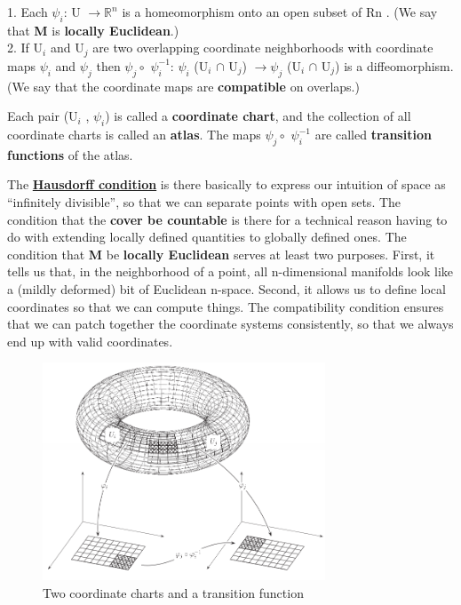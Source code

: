 1. Each $\psi_i$: U $\rightarrow \mathbb{R}^n$ is a homeomorphism onto an open subset of Rn . (We say
that \textbf{M} is \textbf{locally Euclidean}.) \\
2. If U$_i$ and U$_j$ are two overlapping coordinate neighborhoods with coordinate maps $\psi_i$ and $\psi_j$ 
then $\psi_j \circ$ $\psi_i^{-1}$: $\psi_i$ (U$_i$ $\cap$ U$_j$) $\rightarrow \psi_j$ (U$_i$ $\cap$ U$_j$) is
a diffeomorphism. (We say that the coordinate maps are \textbf{compatible} on
overlaps.)

Each pair (U$_i$ , $\psi_i$) is called a \textbf{coordinate chart}, and the collection of all coordinate
charts is called an \textbf{atlas}. The maps $\psi_j \circ$  $\psi_i^{-1}$ are called \textbf{transition functions} of the
atlas.

The \href{https://www.quora.com/What-is-the-significance-of-Hausdorff-Spaces-How-do-these-measurements-help-us-What-does-it-allow-us-to-have}{\textbf{Hausdorff condition}}
is there basically to express our intuition of space as “infinitely divisible”, so that we can separate points with open sets. 
The condition that the \textbf{cover be countable} is there for a technical reason having to do
with extending locally defined quantities to globally defined ones. 
The condition that \textbf{M} be \textbf{locally Euclidean} serves at least two purposes. 
First, it tells us that, in the neighborhood of a point, all n-dimensional manifolds look like a (mildly deformed) bit of Euclidean n-space. 
Second, it allows us to define local coordinates so that we can compute things. 
The compatibility condition ensures that we can patch together the coordinate systems consistently, so that we always end up with valid coordinates.
\begin{figure}
    \begin{center}
        \includegraphics[width=0.75\textwidth]{figures/coordinate-chart.png}
        \caption{Two coordinate charts and a transition function}
    \end{center}
\end{figure}

